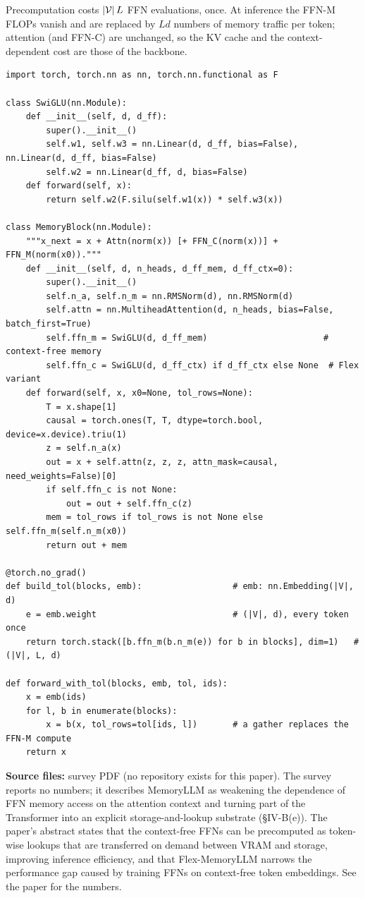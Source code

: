 Precomputation costs $\left\lvert \mathcal{V}\right\rvert L$ FFN evaluations, once. At inference the FFN-M FLOPs
vanish and are replaced by $L d$ numbers of memory traffic per token; attention (and FFN-C) are
unchanged, so the KV cache and the context-dependent cost are those of the backbone.

\begin{lstlisting}[caption={Reference implementation (ours): a MemoryLLM-style block and the token-wise lookup table.},label={lst:c10-memllm-ref}]
import torch, torch.nn as nn, torch.nn.functional as F

class SwiGLU(nn.Module):
    def __init__(self, d, d_ff):
        super().__init__()
        self.w1, self.w3 = nn.Linear(d, d_ff, bias=False), nn.Linear(d, d_ff, bias=False)
        self.w2 = nn.Linear(d_ff, d, bias=False)
    def forward(self, x):
        return self.w2(F.silu(self.w1(x)) * self.w3(x))

class MemoryBlock(nn.Module):
    """x_next = x + Attn(norm(x)) [+ FFN_C(norm(x))] + FFN_M(norm(x0))."""
    def __init__(self, d, n_heads, d_ff_mem, d_ff_ctx=0):
        super().__init__()
        self.n_a, self.n_m = nn.RMSNorm(d), nn.RMSNorm(d)
        self.attn = nn.MultiheadAttention(d, n_heads, bias=False, batch_first=True)
        self.ffn_m = SwiGLU(d, d_ff_mem)                       # context-free memory
        self.ffn_c = SwiGLU(d, d_ff_ctx) if d_ff_ctx else None  # Flex variant
    def forward(self, x, x0=None, tol_rows=None):
        T = x.shape[1]
        causal = torch.ones(T, T, dtype=torch.bool, device=x.device).triu(1)
        z = self.n_a(x)
        out = x + self.attn(z, z, z, attn_mask=causal, need_weights=False)[0]
        if self.ffn_c is not None:
            out = out + self.ffn_c(z)
        mem = tol_rows if tol_rows is not None else self.ffn_m(self.n_m(x0))
        return out + mem

@torch.no_grad()
def build_tol(blocks, emb):                  # emb: nn.Embedding(|V|, d)
    e = emb.weight                           # (|V|, d), every token once
    return torch.stack([b.ffn_m(b.n_m(e)) for b in blocks], dim=1)   # (|V|, L, d)

def forward_with_tol(blocks, emb, tol, ids):
    x = emb(ids)
    for l, b in enumerate(blocks):
        x = b(x, tol_rows=tol[ids, l])       # a gather replaces the FFN-M compute
    return x
\end{lstlisting}

\begin{results}
\textbf{Source files:} survey PDF (no repository exists for this paper). The survey reports no
numbers; it describes MemoryLLM as weakening the dependence of FFN memory access on the attention
context and turning part of the Transformer into an explicit storage-and-lookup substrate
(\S IV-B(e)). The paper's abstract states that the context-free FFNs can be precomputed as
token-wise lookups that are transferred on demand between VRAM and storage, improving inference
efficiency, and that Flex-MemoryLLM narrows the performance gap caused by training FFNs on
context-free token embeddings. See the paper for the numbers.
\end{results}

